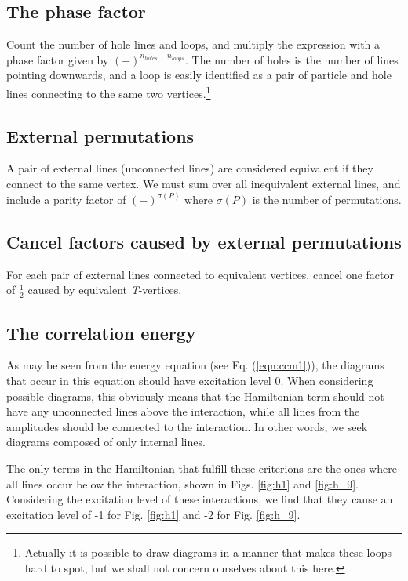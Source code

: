 \subsection{The phase factor}
Count the number of hole lines and loops, and multiply the expression with a phase factor given by $(-)^{n_{holes}-n_{loops}}$. The number of holes is the number of lines pointing downwards, and a loop is easily identified as a pair of particle and hole lines connecting to the same two vertices.\footnote{Actually it is possible to draw diagrams in a manner that makes these loops hard to spot, but we shall not concern ourselves about this here.}

\subsection{External permutations}
A pair of external lines (unconnected lines) are considered equivalent if they connect to the same vertex. We must sum over all inequivalent external lines, and include a parity factor of $(-)^{\sigma(P)}$ where $\sigma(P)$ is the number of permutations.

\subsection{Cancel factors caused by external permutations}
For each pair of external lines connected to equivalent vertices, cancel one factor of $\frac{1}{2}$ caused by equivalent \emph{T}-vertices. 

\subsection{The correlation energy}
As may be seen from the energy equation (see Eq. (\ref{eqn:ccm1})), the diagrams that occur in this equation should have excitation level 0. When considering possible diagrams, this obviously means that the Hamiltonian term should not have any unconnected lines above the interaction, while all lines from the amplitudes should be connected to the interaction. In other words, we seek diagrams composed of only internal lines.

The only terms in the Hamiltonian that fulfill these criterions are the ones where all lines occur below the interaction, shown in Figs. \ref{fig:h1} and \ref{fig:h_9}. Considering the excitation level of these interactions, we find that they cause an excitation level of -1 for Fig. \ref{fig:h1} and -2 for Fig. \ref{fig:h_9}.

